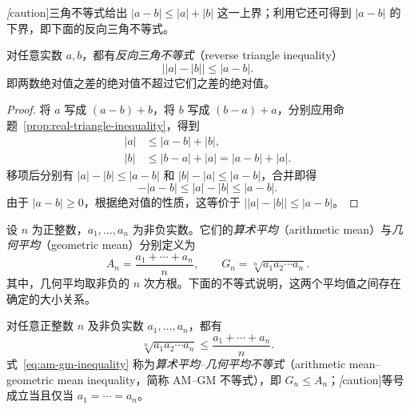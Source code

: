 \emph[caution]{三角不等式给出 $|a-b|\leq |a|+|b|$ 这一上界；利用它还可得到 $|a-b|$ 的下界，即下面的反向三角不等式。}

\begin{corollary}[反向三角不等式]
\label{cor:real-reverse-triangle-inequality}
对任意实数 $a,b$，都有\emph{反向三角不等式}（reverse triangle inequality）
\begin{equation}
    \bigl||a|-|b|\bigr|\leq |a-b|.
    \label{eq:real-reverse-triangle-inequality}
\end{equation}
即两数绝对值之差的绝对值不超过它们之差的绝对值。
\end{corollary}

\begin{proof}
将 $a$ 写成 $(a-b)+b$，将 $b$ 写成 $(b-a)+a$，分别应用命题~\ref{prop:real-triangle-inequality}，得到
\[
    \begin{aligned}
        |a|&\leq |a-b|+|b|,\\
        |b|&\leq |b-a|+|a|=|a-b|+|a|.
    \end{aligned}
\]
移项后分别有 $|a|-|b|\leq |a-b|$ 和 $|b|-|a|\leq |a-b|$，合并即得
\[
    -|a-b|\leq |a|-|b|\leq |a-b|.
\]
由于 $|a-b|\geq 0$，根据绝对值的性质，这等价于 $\bigl||a|-|b|\bigr|\leq |a-b|$。
\end{proof}

\begin{definition}
\label{def:arithmetic-and-geometric-means}
设 $n$ 为正整数，$a_1,\ldots,a_n$ 为非负实数。它们的\emph{算术平均}（arithmetic mean）与\emph{几何平均}（geometric mean）分别定义为
\[
    A_n=\frac{a_1+\cdots+a_n}{n},
    \qquad
    G_n=\sqrt[n]{a_1a_2\cdots a_n}.
\]
其中，几何平均取非负的 $n$ 次方根。下面的不等式说明，这两个平均值之间存在确定的大小关系。
\end{definition}

\begin{proposition}
\label{prop:am-gm-inequality}
对任意正整数 $n$ 及非负实数 $a_1,\ldots,a_n$，都有
\begin{equation}
    \sqrt[n]{a_1a_2\cdots a_n}
    \leq \frac{a_1+\cdots+a_n}{n}.
    \label{eq:am-gm-inequality}
\end{equation}
式~\eqref{eq:am-gm-inequality} 称为\emph{算术平均--几何平均不等式}（arithmetic mean--geometric mean inequality，简称 AM--GM 不等式），即 $G_n\leq A_n$；\emph[caution]{等号成立当且仅当 $a_1=\cdots=a_n$。}
\end{proposition}


